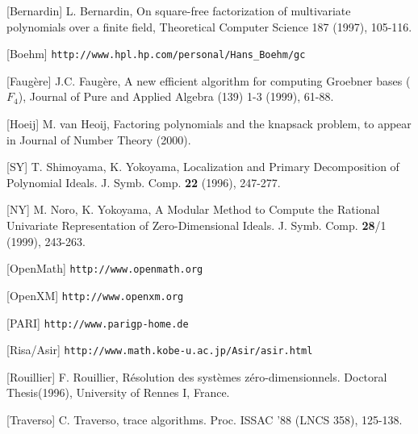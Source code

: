 \begin{slide}{}

[Bernardin] L. Bernardin, On square-free factorization of 
multivariate polynomials over a finite field, Theoretical
Computer Science 187 (1997), 105-116.

[Boehm] {\tt http://www.hpl.hp.com/personal/Hans\_Boehm/gc}

[Faug\`ere] J.C. Faug\`ere,
A new efficient algorithm for computing Groebner bases  ($F_4$),
Journal of Pure and Applied Algebra (139) 1-3 (1999), 61-88.

[Hoeij] M. van Heoij, Factoring polynomials and the knapsack problem,
to appear in Journal of Number Theory (2000).

[SY] T. Shimoyama, K. Yokoyama, Localization and Primary Decomposition of Polynomial Ideals.  J. Symb. Comp. {\bf 22} (1996), 247-277.

[NY] M. Noro, K. Yokoyama, 
A Modular Method to Compute the Rational Univariate
Representation of Zero-Dimensional Ideals.
J. Symb. Comp. {\bf 28}/1 (1999), 243-263.

[OpenMath] {\tt http://www.openmath.org}

[OpenXM] {\tt http://www.openxm.org}

[PARI] {\tt http://www.parigp-home.de}

[Risa/Asir] {\tt http://www.math.kobe-u.ac.jp/Asir/asir.html}

[Rouillier] F. Rouillier,
R\'esolution des syst\`emes z\'ero-dimensionnels. 
Doctoral Thesis(1996), University of Rennes I, France.

[Traverso] C. Traverso, \gr trace algorithms. Proc. ISSAC '88 (LNCS 358), 125-138.

\end{slide}

\begin{slide}{}
\begin{center}
\end{center}
\end{slide}

